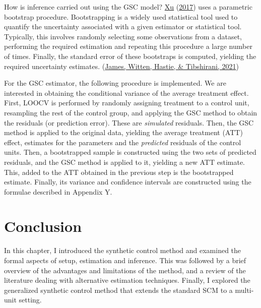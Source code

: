 \documentclass[12pt,nobind, a4paper]{reedthesis}
\begin{document}
 How is inference carried out using the GSC model? \protect\hyperlink{ref-xu_generalized_2017}{Xu} (\protect\hyperlink{ref-xu_generalized_2017}{2017}) uses a parametric bootstrap procedure. Bootstrapping is a widely used statistical tool used to quantify the uncertainty associated with a given estimator or statistical tool. Typically, this involves randomly selecting some observations from a dataset, performing the required estimation and repeating this procedure a large number of times. Finally, the standard error of these bootstraps is computed, yielding the required uncertainty estimates. (\protect\hyperlink{ref-james_introduction_2021}{James, Witten, Hastie, \& Tibshirani, 2021})
 \linebreak

 For the GSC estimator, the following procedure is implemented. We are interested in obtaining the conditional variance of the average treatment effect. First, LOOCV is performed by randomly assigning treatment to a control unit, resampling the rest of the control group, and applying the GSC method to obtain the residuals (or prediction error). These are \textit{simulated} residuals. Then, the GSC method is applied to the original data, yielding the average treatment (ATT) effect, estimates for the parameters and the \textit{predicted} residuals of the control units. Then, a bootstrapped sample is constructed using the two sets of predicted residuals, and the GSC method is applied to it, yielding a new ATT estimate. This, added to the ATT obtained in the previous step is the bootstrapped estimate. Finally, its variance and confidence intervals are constructed using the formulae described in Appendix Y.

 \hypertarget{conclusion-1}{%
 \section{Conclusion}\label{conclusion-1}}

 In this chapter, I introduced the synthetic control method and examined the formal aspects of setup, estimation and inference. This was followed by a brief overview of the advantages and limitations of the method, and a review of the literature dealing with alternative estimation techniques. Finally, I explored the generalized synthetic control method that extends the standard SCM to a multi-unit setting.
 \linebreak
\end{document}
